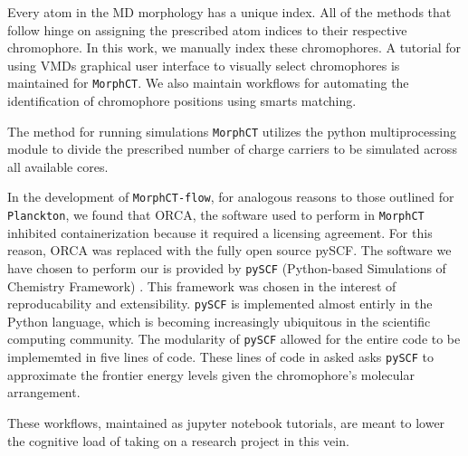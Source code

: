 Every atom in the MD morphology has a unique index. All of the methods that follow hinge on assigning the prescribed atom indices to their respective chromophore. 
In this work, we manually index these chromophores. A tutorial for using VMDs graphical user interface to
visually select chromophores is maintained for \texttt{MorphCT}.
We also maintain workflows for automating the identification of chromophore positions using smarts
matching.

The method for running  simulations 
\texttt{MorphCT} utilizes the python multiprocessing module to divide the prescribed number of charge carriers to be simulated across all available cores.




In the development of \texttt{MorphCT-flow}, for analogous reasons to those outlined for \texttt{Planckton}, we
found that ORCA, the software used to perform  in \texttt{MorphCT} inhibited containerization because it
required a licensing agreement. For this reason, ORCA was replaced with the fully open source pySCF. 
The software we have chosen to perform our  is
provided by \texttt{pySCF} (Python-based Simulations of Chemistry Framework) \cite{Sun2018a}. This framework
was chosen in the interest of reproducability and extensibility.
\texttt{pySCF} is implemented almost entirly in the Python 
language, which is becoming increasingly ubiquitous in the scientific computing community. The modularity of
\texttt{pySCF} allowed for the entire  code to be implememted in five lines of code. These lines of code in 
asked asks \texttt{pySCF} to approximate the frontier energy levels given the chromophore's molecular arrangement.  

These workflows, maintained as jupyter notebook tutorials, 
are meant to lower the cognitive load of taking on a research project in this vein. 


